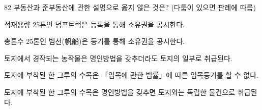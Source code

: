 \begin{question}{82}
부동산과 준부동산에 관한 설명으로 옳지 않은 것은? (다툼이 있으면 판례에 따름)
\begin{choices}
  \item 적재용량 25톤인 덤프트럭은 등록을 통해 소유권을 공시한다.
  \item 총톤수 25톤인 범선(帆船)은 등기를 통해 소유권을 공시한다.
  \item 토지에서 경작되는 농작물은 명인방법을 갖추더라도 토지의 일부로 취급된다.
  \item 토지에 부착된 한 그루의 수목은 「입목에 관한 법률」에 따른 입목등기를 할 수 없다.
  \item 토지에 부착된 한 그루의 수목은 명인방법을 갖추면 토지와는 독립한 물건으로 취급된다.
\end{choices}
\end{question}
